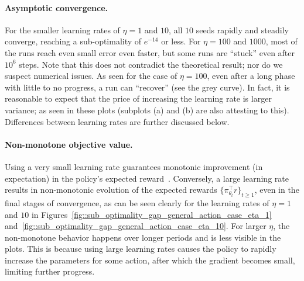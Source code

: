 \paragraph{Asymptotic convergence.} %
For the smaller learning rates of $\eta = 1$ and $10$, all $10$ seeds rapidly and steadily converge, reaching a sub-optimality of $e^{-14}$ or less. For $\eta = 100$ and $1000$, most of the runs reach even small error even faster, but some runs are ``stuck'' even after $10^6$ steps. Note that this does not contradict the theoretical result; nor do we suspect numerical issues. As seen for the case of $\eta=100$, even after a long phase with little to no progress, a run can ``recover'' (see the grey curve). In fact, it is reasonable to expect that the price of increasing the learning rate is larger variance; as seen in these plots (subplots (a) and (b) are also attesting to this). Differences between learning rates are further discussed below.



\paragraph{Non-monotone objective value.} Using a very small learning rate guarantees monotonic improvement (in expectation) in the policy's expected reward~\citep{mei2024stochastic}. 
Conversely, a large learning rate results in non-monotonic evolution of the expected rewards $\{ \pi_{\theta_t}^\top r \}_{t \ge 1}$, even in the final stages of convergence, as can be seen clearly for 
the learning rates of $\eta = 1$ and $10$ in Figures~\ref{fig::sub_optimality_gap_general_action_case_eta_1} and~\ref{fig::sub_optimality_gap_general_action_case_eta_10}. For larger $\eta$, the non-monotone behavior happens over longer periods and is less visible in the plots. This is because using large learning rates causes the policy to rapidly increase the parameters for some action, after which the gradient becomes small, limiting further progress.

